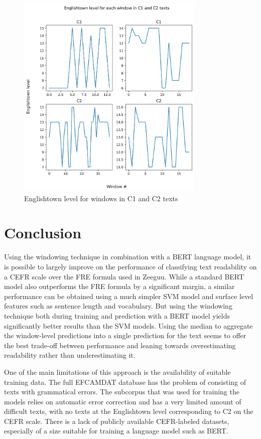 \documentclass[11pt,a4paper]{article}
\begin{document}
\begin{figure}
  \centering
  \includegraphics[width=0.8\textwidth]{figures/level-per-window.png}
  \caption{Englishtown level for windows in C1 and C2 texts}
  \label{fig:level-per-window}
\end{figure}

\section{Conclusion}

Using the windowing technique in combination with a BERT language model, it is
possible to largely improve on the performance of classifying text readability
on a CEFR scale over the FRE formula used in Zeeguu. While a standard BERT
model also outperforms the FRE formula by a significant margin, a similar
performance can be obtained using a much simpler SVM model and surface level
features such as sentence length and vocabulary. But using the windowing
technique both during training and prediction with a BERT model yields
significantly better results than the SVM models. Using the median to aggregate
the window-level predictions into a single prediction for the text seems to
offer the best trade-off between performance and leaning towards overestimating
readability rather than underestimating it.

One of the main limitations of this approach is the availability of suitable
training data. The full EFCAMDAT database has the problem of consisting of
texts with grammatical errors. The subcorpus that was used for training the
models relies on automatic error correction and has a very limited amount of
difficult texts, with no texts at the Englishtown level corresponding to C2 on
the CEFR scale. There is a lack of publicly available CEFR-labeled datasets,
especially of a size suitable for training a language model such as BERT.
\end{document}
